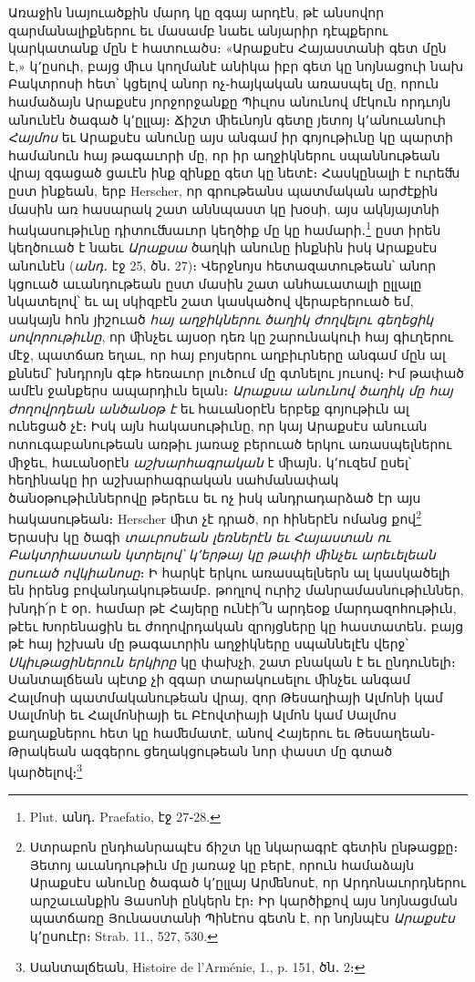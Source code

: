 \documentclass{article}
\begin{document}
{Առաջին նայուածքին մարդ կը զգայ արդէն, թէ անսովոր զարմանալիքներու եւ մասամբ նաեւ անյարիր դէպքերու կարկատանք մըն է հատուածս։ «Արաքսէս Հայաստանի գետ մըն է,» կ՚ըսուի, բայց ﬕւս կողմանէ անիկա իբր գետ կը նոյնացուի նախ Բակտրոսի հետ՝ կցելով անոր ոչ֊հայկական առասպել մը, որուն համաձայն Արաքսէս յորջորջանքը Պիւլոս անունով մէկուն որդւոյն անունէն ծագած կ՚ըլլայ։ Ճիշտ ﬕեւնոյն գետը յետոյ կ՚անուանուի \emph{Հայմոս} եւ Արաքսէս անունը այս անգամ իր գոյութիւնը կը պարտի համանուն հայ թագաւորի մը, որ իր աղջիկներու սպաննութեան վրայ զգացած ցաւէն ինք զինքը գետ կը նետէ։ Հասկընալի է ուրեﬓ ըստ ինքեան, երբ Herscher, որ գրութեանս պատմական արժէքին մասին առ հասարակ շատ աննպաստ կը խօսի, այս ակնյայտնի հակասութիւնը դիտուﬓաւոր կեղծիք մը կը համարի․\footnote{Plut. անդ․ Praefatio, էջ 27֊28.} ըստ իրեն կեղծուած է նաեւ \emph{Արաքսա} ծաղկի անունը ինքնին իսկ Արաքսէս անունէն (\emph{անդ․} էջ 25, ծն․ 27)։ Վերջնոյս հետազատութեան՝ անոր կցուած աւանդութեան ըստ մասին շատ անհաւատալի ըլլալը նկատելով՝ եւ ալ սկիզբէն շատ կասկածով վերաբերուած եմ, սակայն հոն յիշուած \emph{հայ աղջիկներու ծաղիկ ժողվելու գեղեցիկ սովորութիւնը}, որ ﬕնչեւ այսօր դեռ կը շարունակուի հայ գիւղերու մէջ, պատճառ եղաւ, որ հայ բոյսերու աղբիւրները անգամ մըն ալ քննեմ՝ խնդրոյն գէթ հեռաւոր լուծում մը գտնելու յուսով։ Իմ թափած ամէն ջանքերս ապարդիւն ելան։ \emph{Արաքսա անունով ծաղիկ մը հայ ժողովրդեան անծանօթ է} եւ հաւանօրէն երբեք գոյութիւն ալ ունեցած չէ։ Իսկ այն հակասութիւնը, որ կայ Արաքսէս անուան ոտուգաբանութեան առթիւ յառաջ բերուած երկու առասպելներու ﬕջեւ, հաւանօրէն \emph{աշխարհագրական} է ﬕայն․ կ՚ուզեմ ըսել՝ հեղինակը իր աշխարհագրական սահմանափակ ծանօթութիւններովը թերեւս եւ ոչ իսկ անդրադարձած էր այս հակասութեան։ Herscher ﬕտ չէ դրած, որ հիներէն ոմանց քով\footnote{Ստրաբոն ընդհանրապէս ճիշտ կը նկարագրէ գետին ընթացքը։ Յետոյ աւանդութիւն մը յառաջ կը բերէ, որուն համաձայն Արաքսէս անունը ծագած կ՚ըլլայ Արﬔնոսէ, որ Արդոնաւորդներու արշաւանքին Յասոնի ընկերն էր։ Իր կարծիքով այս նոյնացման պատճառը Յունաստանի Պինէոս գետն է, որ նոյնպէս \emph{Արաքսէս} կ՚ըսուէր։ Strab. 11., 527, 530.} Երասխ կը ծագի \emph{տաւրոսեան լեռներէն եւ Հայաստան ու Բակտրիաստան կտրելով՝ կ՚երթայ կը թափի ﬕնչեւ արեւելեան ըսուած ովկիանոսը}։ Ի հարկէ երկու առասպելներն ալ կասկածելի են իրենց բովանդակութեամբ․ թողլով ուրիշ մանրամասնութիւններ, խնդի՛ր է օր․ համար թէ Հայերը ունէի՞ն արդեօք մարդազոհութիւն, թէեւ Խորենացին եւ ժողովրդական զրոյցները կը հաստատեն․ բայց թէ հայ իշխան մը թագաւորին աղջիկները սպաննելէն վերջ՝ \emph{Սկիւթացիներուն երկիրը} կը փախչի, շատ բնական է եւ ընդունելի։ Սանտալճեան պէտք չի զգար տարակուսելու ﬕնչեւ անգամ Հալմոսի պատմականութեան վրայ, զոր Թեսաղիայի Ալմոնի կամ Սալմոնի եւ Հալմոնիայի եւ Բէովտիայի Ալմոն կամ Սալմոս քաղաքներու հետ կը հաﬔմատէ, անով Հայերու եւ Թեսաղեան֊Թրակեան ազգերու ցեղակցութեան նոր փաստ մը գտած կարծելով։\footnote{Սանտալճեան, Histoire de l'Arménie, 1., p. 151, ծն․ 2։}

}
\end{document}
